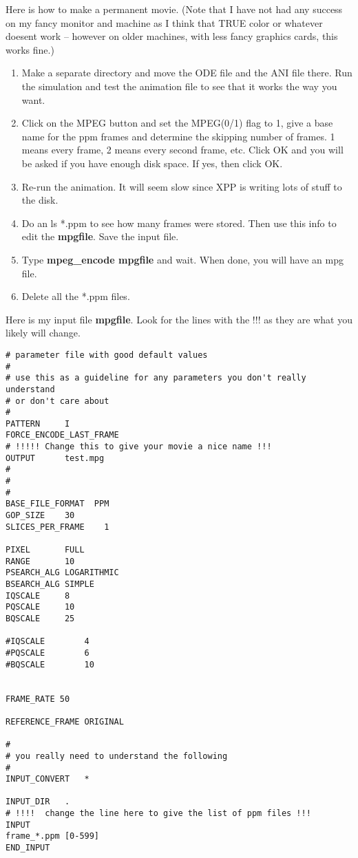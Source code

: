 \documentclass{article}
\begin{document}
Here is how to make a permanent movie. (Note that I have not had any
success on my fancy monitor and machine as I think that TRUE color or
whatever doesent work -- however on older machines, with less fancy
graphics cards, this works fine.)

\begin{enumerate}
\item Make a separate directory and move the ODE file and the ANI file
there. Run the simulation and test the animation file to see that it
works the way you want.
\item Click on the MPEG button and set the MPEG(0/1) flag to 1, give a
base name for the ppm frames and determine the skipping number of
frames. 1 means every frame, 2 means every second frame, etc.  Click
OK and you will be asked if you have enough disk space. If yes, then
click OK. 
\item Re-run the animation. It will seem slow since XPP is writing
lots of stuff to the disk. 
\item Do an ls *.ppm  to see how many frames were stored. Then use
this info to edit the {\bf mpgfile}. Save the input file.
\item Type {\bf mpeg\_encode mpgfile} and wait. When done, you will
have an mpg file. 
\item Delete all the *.ppm files.
\end{enumerate}

Here is my input file {\bf mpgfile}. Look for the lines with the !!!
as they are what you likely will change.

\begin{verbatim}
# parameter file with good default values
#
# use this as a guideline for any parameters you don't really understand
# or don't care about
#
PATTERN		I
FORCE_ENCODE_LAST_FRAME
# !!!!! Change this to give your movie a nice name !!!
OUTPUT		test.mpg
#
# 
#
BASE_FILE_FORMAT  PPM
GOP_SIZE	30
SLICES_PER_FRAME	1

PIXEL		FULL
RANGE		10
PSEARCH_ALG	LOGARITHMIC
BSEARCH_ALG	SIMPLE
IQSCALE		8
PQSCALE		10
BQSCALE		25

#IQSCALE		4
#PQSCALE		6
#BQSCALE		10


FRAME_RATE 50

REFERENCE_FRAME	ORIGINAL

#
# you really need to understand the following
#
INPUT_CONVERT	*

INPUT_DIR	.
# !!!!  change the line here to give the list of ppm files !!!
INPUT
frame_*.ppm [0-599]
END_INPUT
\end{verbatim}
\end{document}
